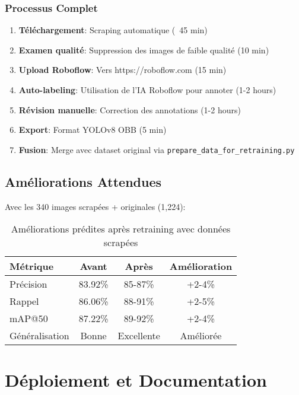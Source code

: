 \documentclass[a4paper,12pt]{report}
\begin{document}
\subsection{Processus Complet}

\begin{enumerate}
    \item \textbf{Téléchargement}: Scraping automatique (~45 min)
    \item \textbf{Examen qualité}: Suppression des images de faible qualité (10 min)
    \item \textbf{Upload Roboflow}: Vers https://roboflow.com (15 min)
    \item \textbf{Auto-labeling}: Utilisation de l'IA Roboflow pour annoter (1-2 hours)
    \item \textbf{Révision manuelle}: Correction des annotations (1-2 hours)
    \item \textbf{Export}: Format YOLOv8 OBB (5 min)
    \item \textbf{Fusion}: Merge avec dataset original via \texttt{prepare\_data\_for\_retraining.py}
\end{enumerate}

\section{Améliorations Attendues}

Avec les 340 images scrapées + originales (1,224):

\begin{table}[H]
    \centering
    \begin{tabular}{|l|c|c|c|}
    \hline
    \textbf{Métrique} & \textbf{Avant} & \textbf{Après} & \textbf{Amélioration} \\
    \hline
    Précision & 83.92\% & 85-87\% & +2-4\% \\
    \hline
    Rappel & 86.06\% & 88-91\% & +2-5\% \\
    \hline
    mAP@50 & 87.22\% & 89-92\% & +2-4\% \\
    \hline
    Généralisation & Bonne & Excellente & Améliorée \\
    \hline
    \end{tabular}
    \caption{Améliorations prédites après retraining avec données scrapées}
\end{table}

\chapter{Déploiement et Documentation}
\end{document}
